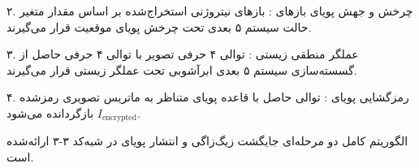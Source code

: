 

۲. چرخش و جهش پویای بازهای  : بازهای نیتروژنی استخراج‌شده بر اساس مقدار متغیر حالت سیستم ۵ بعدی تحت چرخش پویای موقعیت قرار می‌گیرند.\par

۳. عملگر منطقی زیستی : توالی ۴ حرفی  تصویر با توالی ۴ حرفی  حاصل از گسسته‌سازی سیستم ۵ بعدی ابرآشوبی تحت عملگر  زیستی قرار می‌گیرند.\par

۴. رمزگشایی پویای : توالی حاصل با قاعده پویای متناظر به ماتریس تصویری رمزشده $I_{\mathrm{encrypted}}$ بازگردانده می‌شود.\par






الگوریتم کامل دو مرحله‌ای جایگشت زیگ‌زاگی و انتشار پویای  در شبه‌کد ۳{-}۳ ارائه‌شده است.\par



